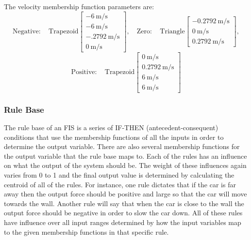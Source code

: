 The velocity membership function parameters are: \begin{displaymath} \mathrm{Negative:}\quad
\mathrm{Trapezoid}\begin{bmatrix}
\SI{-6}{\metre\per\second}\\\SI{-6}{\metre\per\second}\\\SI{-.2792}{\metre\per\second}\\\SI{0}{\metre\per\second}
\end{bmatrix}, \quad \mathrm{Zero:}\quad \mathrm{Triangle}\begin{bmatrix}
    \SI{-0.2792}{\metre\per\second}\\\SI{0}{\metre\per\second}\\\SI{0.2792}{\metre\per\second} \end{bmatrix},
\end{displaymath} \begin{displaymath} \mathrm{Positive:}\quad \mathrm{Trapezoid}\begin{bmatrix}
\SI{0}{\metre\per\second}\\\SI{0.2792}{\metre\per\second}\\\SI{6}{\metre\per\second}\\\SI{6}{\metre\per\second}
\end{bmatrix} \end{displaymath} \subsubsection{Rule Base}\label{ss:rulebase} The rule base of an FIS is a
series of IF-THEN (antecedent-consequent) conditions that use the membership functions of all the inputs in
order to determine the output variable. There are also several membership functions for the output variable
that the rule base maps to. Each of the rules has an influence on what the output of the system should be. The
weight of these influences again varies from 0 to 1 and the final output value is determined by calculating
the centroid of all of the rules. For instance, one rule dictates that if the car is far away then the output
force should be positive and large so that the car will move towards the wall. Another rule will say that when
the car is close to the wall the output force should be negative in order to slow the car down. All of these
rules have influence over all input ranges determined by how the input variables map to the given membership
functions in that specific rule.

